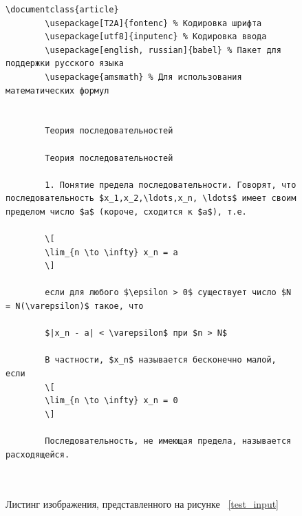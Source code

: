\begin{figure}
    \begin{lstlisting}[language={[LaTeX]TeX}]
        \documentclass{article}
        \usepackage[T2A]{fontenc} % Кодировка шрифта
        \usepackage[utf8]{inputenc} % Кодировка ввода
        \usepackage[english, russian]{babel} % Пакет для поддержки русского языка
        \usepackage{amsmath} % Для использования математических формул
            
        
        Теория последовательностей
        
        Теория последовательностей
        
        1. Понятие предела последовательности. Говорят, что последовательность $x_1,x_2,\ldots,x_n, \ldots$ имеет своим пределом число $a$ (короче, сходится к $a$), т.е.
        
        \[
        \lim_{n \to \infty} x_n = a
        \]
        
        если для любого $\epsilon > 0$ существует число $N = N(\varepsilon)$ такое, что
        
        $|x_n - a| < \varepsilon$ при $n > N$
        
        В частности, $x_n$ называется бесконечно малой, если
        \[
        \lim_{n \to \infty} x_n = 0
        \]
        
        Последовательность, не имеющая предела, называется расходящейся.
            
        
    \end{lstlisting}
    \caption{Листинг изображения, представленного на рисунке ~\ref{test_input}}
    \label{test_listing}
\end{figure}